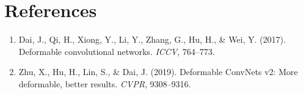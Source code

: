 \documentclass[11pt,a4paper]{article}
\theoremstyle{definition}
\begin{document}
\section{References}
\begin{enumerate}
    \item Dai, J., Qi, H., Xiong, Y., Li, Y., Zhang, G., Hu, H., & Wei, Y. (2017). Deformable convolutional networks. \emph{ICCV}, 764--773.
    \item Zhu, X., Hu, H., Lin, S., & Dai, J. (2019). Deformable ConvNets v2: More deformable, better results. \emph{CVPR}, 9308--9316.
\end{enumerate}
\end{document}
